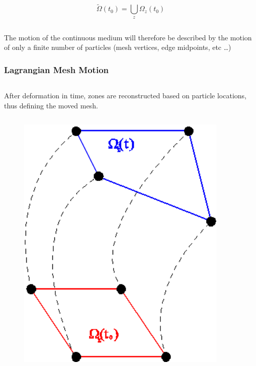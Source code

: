\documentclass[8pt,xcolor=svgnames]{beamer}
\begin{document}
\begin{frame}
\begin{columns}
\begin{column}{0.4\textwidth}
\begin{Large}
    \[
     \tilde{\Omega} (t_0)=\bigcup_z \Omega_z(t_0)
    \]
    \end{Large}
  \end{column}
\end{columns}
\vspace*{-4ex}
\begin{center}
\bigskip
\bigskip
\begin{block}{}
The motion of the continuous medium will therefore be described by the motion of only a finite number of particles (mesh vertices, edge midpoints, etc …)
\end{block}
\end{center}
\end{frame}

\begin{frame}
 \frametitle{Lagrangian Mesh Motion}
 \begin{columns}[T]
  \begin{column}{0.65\textwidth}
   After deformation in time, zones are reconstructed based on particle locations, thus defining the moved mesh.
   \begin{columns}
   \begin{column}{0.5\textwidth}
   \begin{figure}[h!]
    \centering
    \includegraphics[width=0.9\textwidth,keepaspectratio=true]{./Images/motion1.png}

\end{figure}
\end{column}
\end{columns}
\end{column}
\end{columns}
\end{frame}
\end{document}

